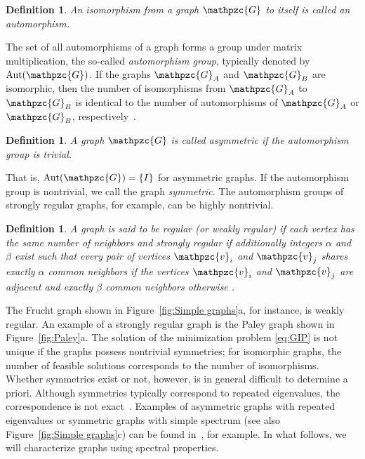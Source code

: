 \documentclass
[
    a4paper,
    DIV=11,
    abstracton
]
{scrartcl}
\newcommand{\mc}[1]{\mathpzc{#1}}
\DeclareMathOperator{\Aut}{Aut}
\newtheorem{definition}[theorem]{Definition}
\theoremstyle{definition}
\begin{document}
\begin{definition}
An isomorphism from a graph $ \mc{G} $ to itself is called an \emph{automorphism}. 
\end{definition}

The set of all automorphisms of a graph forms a group under matrix multiplication, the so-called \emph{automorphism group}, typically denoted by $ \Aut(\mc{G}) $. If the graphs $ \mc{G}_A $ and $ \mc{G}_B $ are isomorphic, then the number of isomorphisms from $ \mc{G}_A $ to $ \mc{G}_B $ is identical to the number of automorphisms of $ \mc{G}_A $ or $ \mc{G}_B $, respectively~\cite{Spi09}.

\begin{definition}
A graph $ \mc{G} $ is called \emph{asymmetric} if the automorphism group is trivial.
\end{definition}

That is, $ \Aut(\mc{G}) = \{ I \} $ for asymmetric graphs. If the automorphism group is nontrivial, we call the graph \emph{symmetric}. The automorphism groups of strongly regular graphs, for example, can be highly nontrivial.

\begin{definition}
A graph is said to be \emph{regular} (or \emph{weakly regular}) if each vertex has the same number of neighbors and \emph{strongly regular} if additionally integers $ \alpha $ and $ \beta $ exist such that every pair of vertices $ \mc{v}_i $ and $ \mc{v}_j $ shares exactly $ \alpha $ common neighbors if the vertices $ \mc{v}_i $ and $ \mc{v}_j $ are adjacent and exactly $ \beta $ common neighbors otherwise \cite{Spi96}.
\end{definition}

The Frucht graph shown in Figure~\ref{fig:Simple graphs}a, for instance, is weakly regular. An example of a strongly regular graph is the Paley graph shown in Figure~\ref{fig:Paley}a. The solution of the minimization problem \eqref{eq:GIP} is not unique if the graphs possess nontrivial symmetries; for isomorphic graphs, the number of feasible solutions corresponds to the number of isomorphisms. Whether symmetries exist or not, however, is in general difficult to determine a priori. Although symmetries typically correspond to repeated eigenvalues, the correspondence is not exact~\cite{Lov07}. Examples of asymmetric graphs with repeated eigenvalues or symmetric graphs with simple spectrum (see also Figure~\ref{fig:Simple graphs}c) can be found in~\cite{FS15}, for example. In what follows, we will characterize graphs using spectral properties.
\end{document}
